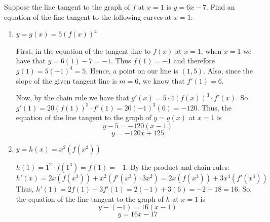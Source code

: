 \documentclass[nooutcomes]{ximera}
\begin{document}
\begin{problem}
Suppose the line tangent to the graph of $f$ at $x=1$ is $y=6x-7$.  Find an equation of the line tangent to the following curves at $x=1$:
	\begin{enumerate}
	
	\item  $y=g(x) = 5(f(x))^4$  
		\begin{freeResponse}
		First, in the equation of the tangent line to $f(x)$ at $x=1$, when $x=1$ we have that $y= 6(1) - 7 = -1$.  Thus $f(1) = -1$ and therefore $g(1) = 5(-1)^4 = 5$.  Hence, a point on our line is $(1,5)$.  Also, since the slope of the given tangent line is $m=6$, we know that $f'(1) = 6$.
		
		Now, by the chain rule we have that $g'(x) = 5 \cdot 4 (f(x))^3 \cdot f'(x)$.  So $g'(1) = 20(f(1))^3 \cdot f'(1) = 20(-1)^3 (6) = -120.$  Thus, the equation of the line tangent to the graph of $y = g(x)$ at $x=1$ is
		$$ y - 5 = -120(x-1) $$
		$$ y = -120x + 125 $$
		\end{freeResponse}

	\item  $y=h(x) = x^2 (f(x^3))$
		\begin{freeResponse}
		$h(1) = 1^2 \cdot f(1^3) = f(1) = -1$.  By the product and chain rules:
		$$ h'(x) = 2x(f(x^3)) + x^2(f'(x^3) \cdot 3x^2) = 2x(f(x^3)) + 3x^4(f'(x^3)) $$
		Thus, $h'(1) = 2f(1) + 3f'(1) = 2(-1) + 3(6) = -2 + 18 = 16$.  So, the equation of the line tangent to the graph of $h$ at $x=1$ is
		$$ y- (-1) = 16(x-1) $$
		$$ y = 16x - 17 $$
		\end{freeResponse}
	\end{enumerate}		
		
		
	
\end{problem}
\end{document}
